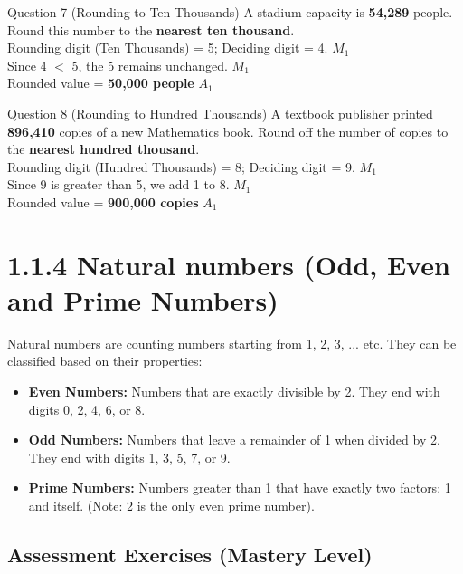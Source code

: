 \documentclass[12pt, a4paper, oneside]{article}
\begin{document}
\begin{solvingbox}{Question 7 (Rounding to Ten Thousands)}
A stadium capacity is \textbf{54,289} people. Round this number to the \textbf{nearest ten thousand}. \\
Rounding digit (Ten Thousands) = 5; Deciding digit = 4. \hfill $M_1$ \\
Since 4 $<$ 5, the 5 remains unchanged. \hfill $M_1$ \\
Rounded value = \textbf{50,000 people} \hfill $A_1$
\end{solvingbox}
\begin{solvingbox}{Question 8 (Rounding to Hundred Thousands)}
A textbook publisher printed \textbf{896,410} copies of a new Mathematics book. Round off the number of copies to the \textbf{nearest hundred thousand}. \\
Rounding digit (Hundred Thousands) = 8; Deciding digit = 9. \hfill $M_1$ \\
Since 9 is greater than 5, we add 1 to 8. \hfill $M_1$ \\
Rounded value = \textbf{900,000 copies} \hfill $A_1$
\end{solvingbox}

\section*{1.1.4 Natural numbers (Odd, Even and Prime Numbers)}

\begin{tcolorbox}[colback=lightgrey, colframe=primaryblue, title=\textbf{Concept Summary}, arc=5pt]
    Natural numbers are counting numbers starting from 1, 2, 3, ... etc. They can be classified based on their properties: \\
    
    \begin{itemize}
        \item \textbf{Even Numbers:} Numbers that are exactly divisible by 2. They end with digits 0, 2, 4, 6, or 8.
        \item \textbf{Odd Numbers:} Numbers that leave a remainder of 1 when divided by 2. They end with digits 1, 3, 5, 7, or 9.
        \item \textbf{Prime Numbers:} Numbers greater than 1 that have exactly two factors: 1 and itself. (Note: 2 is the only even prime number).
    \end{itemize}
\end{tcolorbox}

\subsection*{Assessment Exercises (Mastery Level)}
\end{document}
